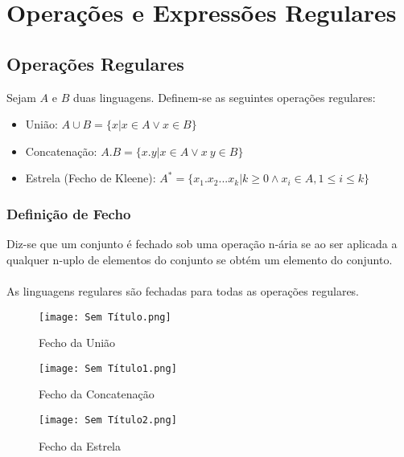 \documentclass[10pt,a4paper]{report}
\begin{document}
\section{Operações e Expressões Regulares}
\subsection{Operações Regulares}
Sejam $A$ e $B$ duas linguagens. Definem-se as seguintes operações regulares:
\begin{itemize}
\item União: $A\cup B = \{x | x \in A \lor x \in B\}$
\item Concatenação: $A.B = \{x.y| x \in A \lor x~y \in B\}$
\item Estrela (Fecho de Kleene): $A^* = \{x_1.x_2...x_k | k \geq 0 \land x_i \in A, 1 \leq i \leq k\}$
\end{itemize}
\subsubsection{Definição de Fecho}
Diz-se que um conjunto é fechado sob uma operação n-ária se ao ser aplicada a qualquer n-uplo de elementos do conjunto se obtém um elemento do conjunto.\\
\\
As linguagens regulares são fechadas para todas as operações regulares.\\
\begin{minipage}{.5\textwidth}
\begin{figure}[H]
\centering
\texttt{[image: Sem Título.png]}
\caption{Fecho da União}
\end{figure}
\end{minipage}
\begin{minipage}{.5\textwidth}
\begin{figure}[H]
\centering
\texttt{[image: Sem Título1.png]}
\caption{Fecho da Concatenação}
\end{figure}
\end{minipage}

\begin{figure}[H]
\centering
\texttt{[image: Sem Título2.png]}
\caption{Fecho da Estrela}
\end{figure}
\end{document}
